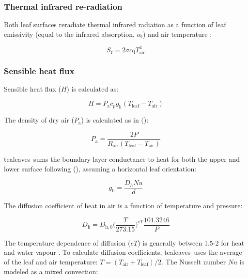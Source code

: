 \documentclass[11pt, oneside]{article}
\newcommand{\pkg}[1]{{\fontseries{b}\selectfont #1}}
\newcommand{\tealeaves}{\pkg{tealeaves}}
\begin{document}
\subsubsection*{Thermal infrared re-radiation}

Both leaf surfaces reradiate thermal infrared radiation as a function of leaf emissivity (equal to the infrared absorption, $\alpha_\mathrm{l}$) and air temperature \citep{Foster_Smith_1986, Okajima_etal_2012}:

\begin{equation}
  S_\mathrm{r} = 2 \sigma \alpha_\mathrm{l} T_\mathrm{air} ^ 4
\end{equation}
  
\subsubsection*{Sensible heat flux}
 
Sensible heat flux ($H$) is calculated as:

\begin{equation}
  H = P_\mathrm{a} c_p g_\mathrm{h} (T_\mathrm{leaf} - T_\mathrm{air})
\end{equation}

The density of dry air ($P_\mathrm{a}$) is calculated as in \citeauthor{Foster_Smith_1986} (\citeyear{Foster_Smith_1986}):

\begin{equation}
  P_\mathrm{a} = \frac{2 P}{R_\mathrm{air} (T_\mathrm{leaf} - T_\mathrm{air})}
\end{equation}

\tealeaves~sums the boundary layer conductance to heat for both the upper and lower surface following \citeauthor{Foster_Smith_1986} (\citeyear{Foster_Smith_1986}), assuming a horizontal leaf orientation:

\begin{equation} \label{eq:g_h}
  g_\mathrm{h} = \frac{D_h \mathit{Nu}}{d}
\end{equation}

The diffusion coefficient of heat in air is a function of temperature and pressure:

\begin{equation} \label{eq:D_x}
    D_\mathrm{h} = D_\mathrm{h,0} \Big(\frac{T}{273.15}\Big) ^ {\mathit{eT}} \frac{101.3246}{P}
\end{equation}

The temperature dependence of diffusion ($\mathit{eT}$) is generally between 1.5-2 for heat and water vapour \citep{Monteith_Unsworth_2013}. To calculate diffusion coefficients, \tealeaves~uses the average of the leaf and air temperature: $T = (T_\mathrm{air} + T_\mathrm{leaf}) / 2$. The Nusselt number $\mathit{Nu}$ is modeled as a mixed convection:
\end{document}

